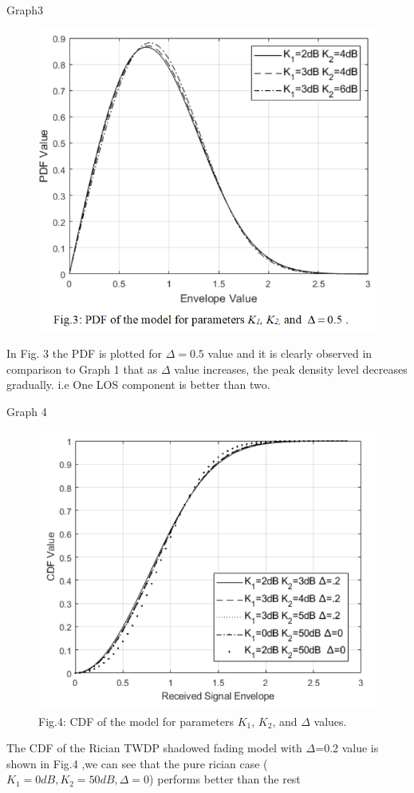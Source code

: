 \documentclass{beamer}
\begin{document}
\begin{frame}{}
   \begin{block}{Graph3}
   \begin{figure}
    \centering
    \includegraphics[width=0.5\columnwidth]{Figures/fig3.PNG}
    \label{fig:my_label}
\end{figure}
In Fig. 3 the PDF  is  plotted  for \(\Delta=0.5\) value and it is clearly observed in comparison to Graph 1 that as \(\Delta\) value   increases,   the   peak   density   level   decreases   gradually. i.e One LOS component is better than two.
\end{block} 
\end{frame}
\begin{frame}{}
\begin{block}{Graph 4}
     \begin{figure}
         \centering
         \includegraphics[width=0.5\columnwidth]{Figures/fig4.PNG}
         \caption{Fig.4: CDF of the model for parameters \(K_1\), \(K_2\), and \(\Delta\) values.}
     \end{figure}
\end{block}
The  CDF  of  the  Rician  TWDP  shadowed  fading  model  with  \(\Delta\)=0.2  value  is  shown  in  Fig.4    ,we can see that the pure rician case (\(K_1=0dB,K_2=50dB,\Delta=0\)) performs better than the rest
\end{frame}
\end{document}
